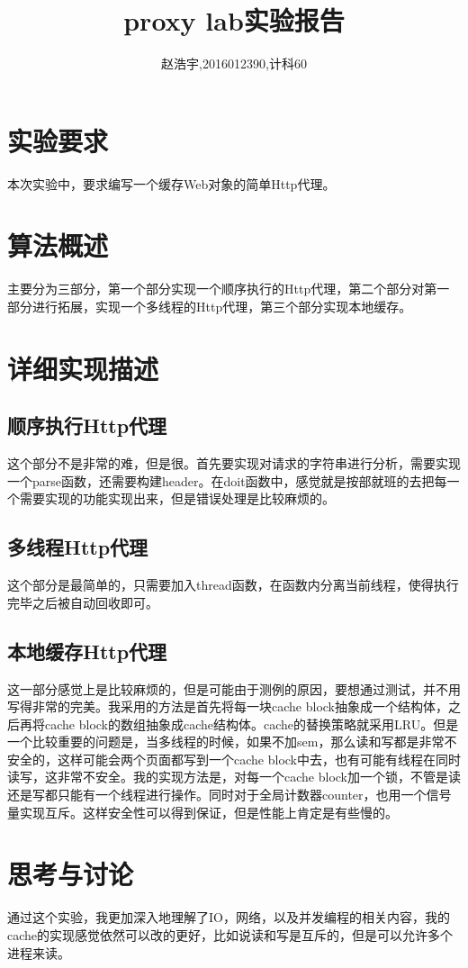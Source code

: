 \documentclass{article}
\title{\bf\huge proxy lab实验报告}
\author{赵浩宇,2016012390,计科60}
\theoremstyle{plain}
\theoremstyle{definition}
\theoremstyle{remark}
\begin{document}
    
    \maketitle

    \section{实验要求}
    本次实验中，要求编写一个缓存Web对象的简单Http代理。

    \section{算法概述}
    主要分为三部分，第一个部分实现一个顺序执行的Http代理，第二个部分对第一部分进行拓展，实现一个多线程的Http代理，第三个部分实现本地缓存。

    \section{详细实现描述}
    \subsection{顺序执行Http代理}
    这个部分不是非常的难，但是很。首先要实现对请求的字符串进行分析，需要实现一个parse函数，还需要构建header。在doit函数中，感觉就是按部就班的去把每一个需要实现的功能实现出来，但是错误处理是比较麻烦的。

    \subsection{多线程Http代理}
    这个部分是最简单的，只需要加入thread函数，在函数内分离当前线程，使得执行完毕之后被自动回收即可。

    \subsection{本地缓存Http代理}
    这一部分感觉上是比较麻烦的，但是可能由于测例的原因，要想通过测试，并不用写得非常的完美。我采用的方法是首先将每一块cache block抽象成一个结构体，之后再将cache block的数组抽象成cache结构体。cache的替换策略就采用LRU。但是一个比较重要的问题是，当多线程的时候，如果不加sem，那么读和写都是非常不安全的，这样可能会两个页面都写到一个cache block中去，也有可能有线程在同时读写，这非常不安全。我的实现方法是，对每一个cache block加一个锁，不管是读还是写都只能有一个线程进行操作。同时对于全局计数器counter，也用一个信号量实现互斥。这样安全性可以得到保证，但是性能上肯定是有些慢的。
    
    \section{思考与讨论}
    通过这个实验，我更加深入地理解了IO，网络，以及并发编程的相关内容，我的cache的实现感觉依然可以改的更好，比如说读和写是互斥的，但是可以允许多个进程来读。
    
\end{document}
